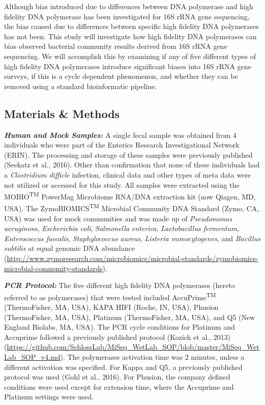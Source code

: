 \documentclass[12pt,]{article}
\begin{document}
Although bias introduced due to differences between DNA polymerase and
high fidelity DNA polymerase has been investigated for 16S rRNA gene
sequencing, the bias caused due to differences between specific high
fidelity DNA polymerases has not been. This study will investigate how
high fidelity DNA polymerases can bias observed bacterial community
results derived from 16S rRNA gene sequencing. We will accomplish this
by examining if any of five different types of high fidelity DNA
polymerases introduce significant biases into 16S rRNA gene surveys, if
this is a cycle dependent phenomenon, and whether they can be removed
using a standard bioinformatic pipeline.

\newpage

\subsection{Materials \& Methods}\label{materials-methods}

\textbf{\emph{Human and Mock Samples:}} A single fecal sample was
obtained from 4 individuals who were part of the Enterics Research
Investigational Network (ERIN). The processing and storage of these
samples were previously published (Seekatz et al., 2016). Other than
confirmation that none of these individuals had a \emph{Clostridium
difficle} infection, clinical data and other types of meta data were not
utilized or accessed for this study. All samples were extracted using
the MOBIO\textsuperscript{TM} PowerMag Microbiome RNA/DNA extraction kit
(now Qiagen, MD, USA). The ZymoBIOMICS\textsuperscript{TM} Microbial
Community DNA Standard (Zymo, CA, USA) was used for mock communities and
was made up of \emph{Pseudomonas aeruginosa}, \emph{Escherichia coli},
\emph{Salmonella enterica}, \emph{Lactobacillus fermentum},
\emph{Enterococcus faecalis}, \emph{Staphylococcus aureus},
\emph{Listeria monocytogenes}, and \emph{Bacillus subtilis} at equal
genomic DNA abundance
(\url{http://www.zymoresearch.com/microbiomics/microbial-standards/zymobiomics-microbial-community-standards}).

\textbf{\emph{PCR Protocol:}} The five different high fidelity DNA
polymerases (hereto referred to as polymerases) that were tested
included AccuPrime\textsuperscript{TM} (ThermoFisher, MA, USA), KAPA
HIFI (Roche, IN, USA), Phusion (ThermoFisher, MA, USA), Platinum
(ThermoFisher, MA, USA), and Q5 (New England Biolabs, MA, USA). The PCR
cycle conditions for Platinum and Accuprime followed a previously
published protocol (Kozich et al., 2013)
(\url{https://github.com/SchlossLab/MiSeq_WetLab_SOP/blob/master/MiSeq_WetLab_SOP_v4.md}).
The polymerases activation time was 2 minutes, unless a different
activation was specified. For Kappa and Q5, a previously published
protocol was used (Gohl et al., 2016). For Phusion, the company defined
conditions were used except for extension time, where the Accuprime and
Platinum settings were used.
\end{document}
